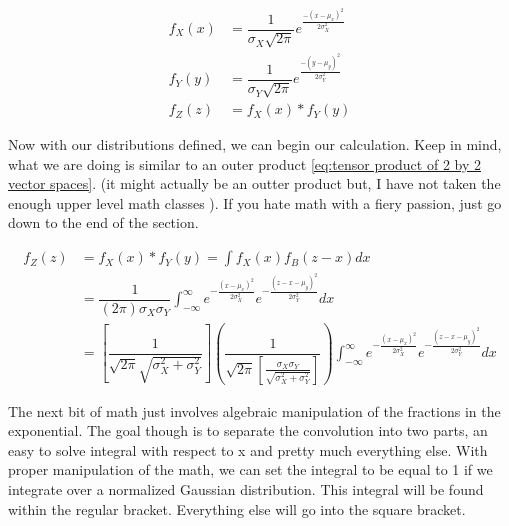 \documentclass[11pt,a4paper]{book}
\begin{document}
		\begin{eqnarray}
			\label{eq: X gaussian distribution}
			f_X(x) & = \dfrac{1}{\sigma_X \sqrt{2 \pi}} e^{\frac{- (x-\mu_x)^2}{2 \sigma_X^2}} \\
			\label{eq: Y gaussian distribution}
			f_Y(y) & = \dfrac{1}{\sigma_Y \sqrt{2 \pi}} e^{\frac{- (y-\mu_y)^2}{2 \sigma_Y^2}} \\
			\label{eq: Z convoluted distribution of X and Y}
			f_Z(z) & = f_X(x) \ast f_Y(y)
		\end{eqnarray}
		
		\noindent
		Now with our distributions defined, we can begin our calculation. Keep in mind, what we are doing is similar to an outer product \autoref{eq:tensor product of 2 by 2 vector spaces}. (it might actually be an outter product but, I have not taken the enough upper level math classes ). If you hate math with a fiery passion, just go down to the end of the section.
		
		\begin{equation}
			\label{eq:convolution of two Gaussian functions part 1}
			\begin{split}
			f_Z(z) & = f_X(x) \ast f_Y(y) = \int{f_X(x) f_B (z-x) dx}\\
			& = \dfrac{1}{(2 \pi) \sigma_X \sigma_Y} 
			\int_{-\infty}^{\infty}{
				e^{- \frac{(x-\mu_x)^2}{2 \sigma_X^2}} e^{- \frac{(z - x - \mu_y)^2}{2 \sigma_Y^2}}dx} \\
			& = \left[
					\dfrac{1}{\sqrt{2 \pi} \sqrt{\sigma_X^2 + \sigma_Y^2}} 
				\right] 
				\left(
					\dfrac{1}{\sqrt{2 \pi}
					\left[ 
						\frac{\sigma_X \sigma_Y}{\sqrt{\sigma_X^2+\sigma_Y^2}}
					\right]}
				\right)
				\int_{-\infty}^{\infty}{e^{-\frac{(x-\mu_x)^2}{2 \sigma_X^2}}} e^{- \frac{(z-x-\mu_y)^2}{2 \sigma_Y^2}}dx 
			\end{split}
		\end{equation}
		
		The next bit of math just involves algebraic manipulation of the fractions in the exponential. The goal though is to separate the convolution into two parts, an easy to solve integral with respect to x and pretty much everything else. With proper manipulation of the math, we can set the integral to be equal to 1 if we integrate over a normalized Gaussian distribution. This integral will be found within the regular bracket. Everything else will go into the square bracket.
		
\end{document}
